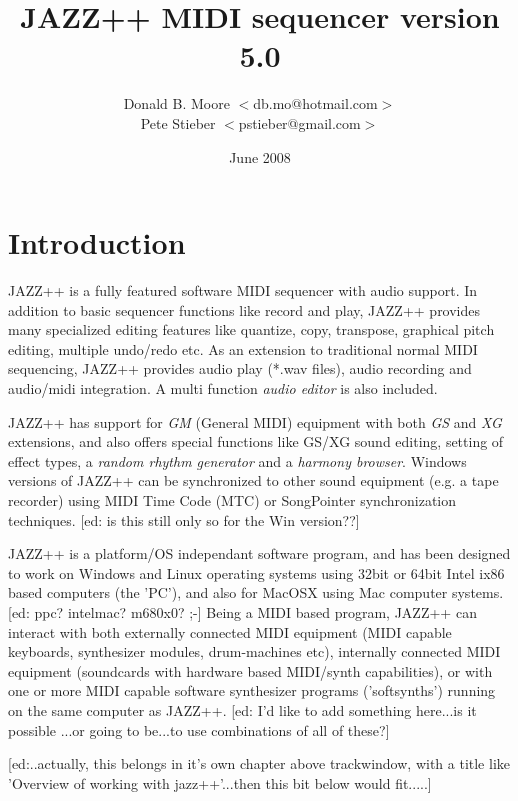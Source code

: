 \documentclass[letterpaper]{report}
\title{JAZZ++ MIDI sequencer version 5.0}%
\author{Donald B. Moore  $<$db.mo@hotmail.com$>$\\
Pete Stieber $<$pstieber@gmail.com$>$}%
\date{June 2008}%
\begin{document}
%
\maketitle%
\pagestyle{fancyplain}%
\tableofcontents%


\chapter{Introduction}\label{introduction}

JAZZ++ is a fully featured software MIDI sequencer with audio support. In
addition to basic sequencer functions like record and play, JAZZ++ provides
many specialized editing features like quantize, copy, transpose, graphical
pitch editing, multiple undo/redo etc. As an extension to traditional normal
MIDI sequencing, JAZZ++ provides audio play (*.wav files), audio recording and
audio/midi integration. A multi function {\em audio editor} is also included.

JAZZ++ has support for {\em GM} (General MIDI) equipment with both {\em GS}
and {\em XG} extensions, and also offers special functions like GS/XG sound
editing, setting of effect types, a {\em random rhythm generator} and a {\em
harmony browser}. Windows versions of JAZZ++ can be synchronized to other sound
equipment (e.g. a tape recorder) using MIDI Time Code (MTC) or SongPointer
synchronization techniques. [ed: is this still only so for the Win version??]

JAZZ++ is a platform/OS independant software program, and has been designed to
work on Windows and Linux operating systems using 32bit or 64bit Intel ix86
based computers (the 'PC'), and also for MacOSX using Mac computer systems. [ed:
ppc? intelmac? m680x0? ;-] Being a MIDI based program, JAZZ++ can interact with
both externally connected MIDI equipment (MIDI capable keyboards, synthesizer
modules, drum-machines etc), internally connected MIDI equipment (soundcards
with hardware based MIDI/synth capabilities), or with one or more MIDI capable
software synthesizer programs ('softsynths') running on the same computer as
JAZZ++. [ed: I'd like to add something here...is it possible ...or going to
be...to use combinations of all of these?]
 


[ed:..actually, this belongs in it's own chapter above trackwindow, with a
title like 'Overview of working with jazz++'...then this bit below would
fit.....]
\end{document}
